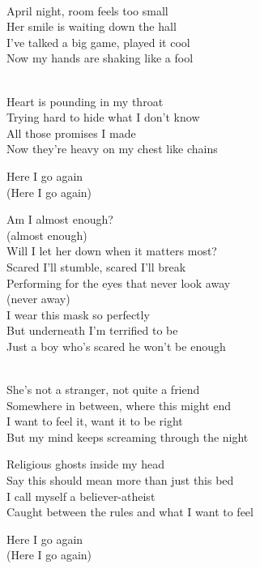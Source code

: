 \begin{lyrics}

\\
April night, room feels too small\\
Her smile is waiting down the hall\\
I’ve talked a big game, played it cool\\
Now my hands are shaking like a fool

\\
Heart is pounding in my throat\\
Trying hard to hide what I don’t know\\
All those promises I made\\
Now they’re heavy on my chest like chains

Here I go again\\
(Here I go again)

Am I almost enough?\\
(almost enough)\\
Will I let her down when it matters most?\\
Scared I’ll stumble, scared I’ll break\\
Performing for the eyes that never look away\\
(never away)\\
I wear this mask so perfectly\\
But underneath I’m terrified to be\\
Just a boy who’s scared he won’t be enough

\\
She’s not a stranger, not quite a friend\\
Somewhere in between, where this might end\\
I want to feel it, want it to be right\\
But my mind keeps screaming through the night

Religious ghosts inside my head\\
Say this should mean more than just this bed\\
I call myself a believer-atheist\\
Caught between the rules and what I want to feel

Here I go again\\
(Here I go again)


\end{lyrics}
